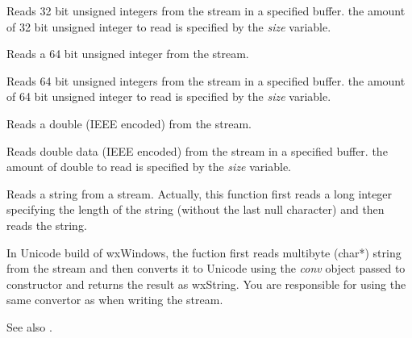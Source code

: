 Reads 32 bit unsigned integers from the stream in a specified buffer. the amount of
32 bit unsigned integer to read is specified by the {\it size} variable.



Reads a 64 bit unsigned integer from the stream.


Reads 64 bit unsigned integers from the stream in a specified buffer. the amount of
64 bit unsigned integer to read is specified by the {\it size} variable.



Reads a double (IEEE encoded) from the stream.


Reads double data (IEEE encoded) from the stream in a specified buffer. the amount of
double to read is specified by the {\it size} variable.

\label{wxdatainputstreamreadstring}


Reads a string from a stream. Actually, this function first reads a long 
integer specifying the length of the string (without the last null character) 
and then reads the string.

In Unicode build of wxWindows, the fuction first reads multibyte (char*)
string from the stream and then converts it to Unicode using the {\it conv}
object passed to constructor and returns the result as wxString. You are
responsible for using the same convertor as when writing the stream.

See also .

